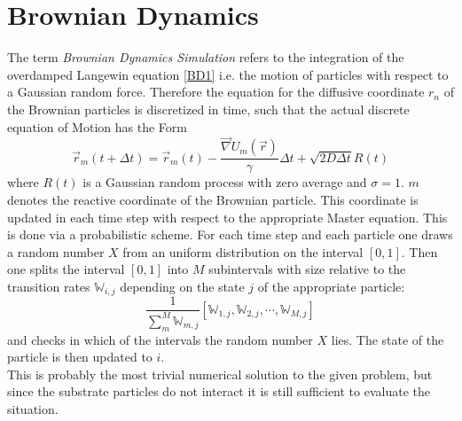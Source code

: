\section{Brownian Dynamics}
\label{BDsim}
The term \textit{Brownian Dynamics Simulation} refers to the integration of the overdamped Langewin equation \eqref{BD1} i.e. the motion of particles with respect to a Gaussian random force. Therefore the equation for the diffusive coordinate $r_n$ of the Brownian particles is discretized in time, such that the actual discrete equation of Motion has the Form
\begin{equation}
    \vec r_m(t + \Delta t) = \vec r_m(t) - \frac{\vec \nabla U_m(\vec r)}{\gamma}\Delta t + \sqrt{2 D \Delta t} R(t)
    \label{discrete_eqm}
\end{equation}
where $R(t)$ is a Gaussian random process with zero average and $\sigma = 1$. $m$ denotes the reactive coordinate of the Brownian particle. This coordinate is updated in each time step with respect to the appropriate Master equation. This is done via a probabilistic scheme. For each time step and each particle one draws a random number $X$ from an uniform distribution on the interval $[0,1]$. Then one splits the interval $[0,1]$ into $M$ subintervals with size relative to the transition rates $\mathbb{W}_{i,j}$ depending on the state $j$ of the appropriate particle:
\begin{equation}
    \frac{1}{\sum_{m}^{M}\mathbb{W}_{m,j}} [\mathbb{W}_{1,j}, \mathbb{W}_{2,j}, \cdots , \mathbb{W}_{M,j}]
    \label{num_meq}
\end{equation}
and checks in which of the intervals the random number $X$ lies. The state of the particle is then updated to $i$.\\
This is probably the most trivial numerical solution to the given problem, but since the substrate particles do not interact it is still sufficient to evaluate the situation.

